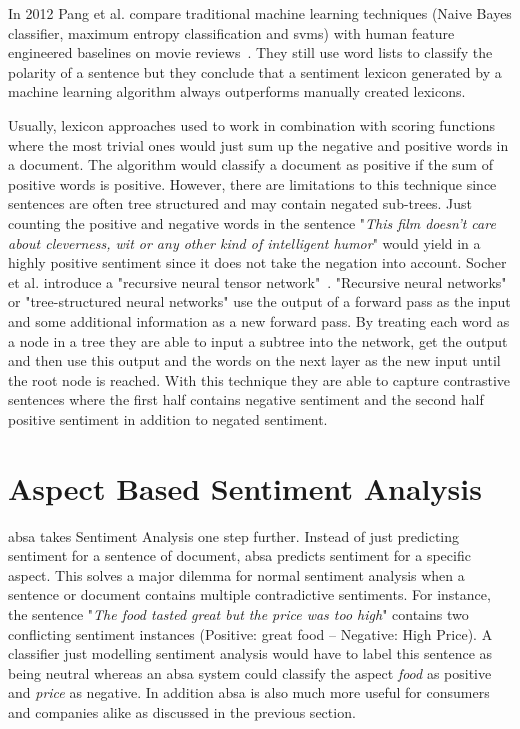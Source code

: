 In 2012 Pang et al. compare traditional machine learning techniques {(Naive Bayes classifier, maximum entropy classification and \glspl{svm})} with human feature engineered baselines on movie reviews~\cite{Pang2012}. They still use word lists to classify the polarity of a sentence but they conclude that a sentiment lexicon generated by a machine learning algorithm always outperforms manually created lexicons.
\medskip


Usually, lexicon approaches used to work in combination with scoring functions where the most trivial ones would just sum up the negative and positive words in a document. The algorithm would classify a document as positive if the sum of positive words is positive. However, there are limitations to this technique since sentences are often tree structured and may contain negated sub-trees. Just counting the positive and negative words in the sentence "\textit{This film doesn't care about cleverness, wit or any other kind of intelligent humor}" would yield in a highly positive sentiment since it does not take the negation into account. Socher et al. introduce a "recursive neural tensor network"~\cite{Socher2013}. "Recursive neural networks" or "tree-structured neural networks" use the output of a forward pass as the input and some additional information as a new forward pass. By treating each word as a node in a tree they are able to input a subtree into the network, get the output and then use this output and the words on the next layer as the new input until the root node is reached. With this technique they are able to capture contrastive sentences where the first half contains negative sentiment and the second half positive sentiment in addition to negated sentiment. 
\medskip

\section{Aspect Based Sentiment Analysis}
\label{sec:02_absa}

\acrfull{absa} takes Sentiment Analysis one step further. Instead of just predicting sentiment for a sentence of document, \gls{absa} predicts sentiment for a specific aspect. This solves a major dilemma for normal sentiment analysis when a sentence or document contains multiple contradictive sentiments. For instance, the sentence "\textit{The food tasted great but the price was too high}" contains two conflicting sentiment instances {(Positive: great food -- Negative: High Price)}. A classifier just modelling sentiment analysis would have to label this sentence as being neutral whereas an \gls{absa} system could classify the aspect \textit{food} as positive and \textit{price} as negative. In addition \gls{absa} is also much more useful for consumers and companies alike as discussed in the previous section.
\medskip

